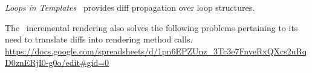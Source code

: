 \begin{compact_item}
\begin{compact_enum}
\item \textit{Loops in Templates} \projname\ provides diff propagation over loop structures.  

% 
\end{compact_enum}
%
The \projname\ incremental rendering also solves the following problems pertaining to its need to translate diffs into rendering method calls.   \url{https://docs.google.com/spreadsheets/d/1pn6EPZUnz\_3Tc3e7FnveRxQXcs2uRqD0znERjI0-g0o/edit#gid=0}
\begin{compact_enum}


\end{compact_enum}
\end{compact_item}
